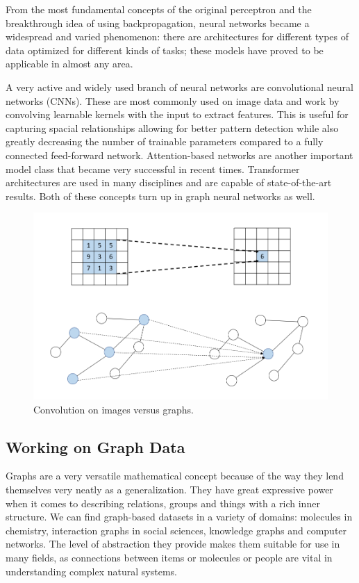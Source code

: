 	From the most fundamental concepts of the original perceptron and the breakthrough idea of using backpropagation, neural networks became a widespread and varied phenomenon: there are architectures for different types of data optimized for different kinds of tasks; these models have proved to be applicable in almost any area\cite{shrestha2019review}.
	
	A very active and widely used branch of neural networks are convolutional neural networks (CNNs)\cite{li2021survey}. These are most commonly used on image data and work by convolving learnable kernels with the input to extract features. This is useful for capturing spacial relationships allowing for better pattern detection while also greatly decreasing the number of trainable parameters compared to a fully connected feed-forward network. Attention-based networks\cite{vaswani2017attention} are another important model class that became very successful in recent times. Transformer architectures are used in many disciplines and are capable of state-of-the-art results. Both of these concepts turn up in graph neural networks as well.
	
	\begin{figure}[!h]
		\centering
		\includegraphics[width=\textwidth]{figures/convolution.png}
		\caption{Convolution on images versus graphs.}
	\end{figure}
	
	\subsection{Working on Graph Data}
	
	Graphs are a very versatile mathematical concept because of the way they lend themselves very neatly as a generalization. They have great expressive power when it comes to describing relations, groups and things with a rich inner structure. We can find graph-based datasets in a variety of domains: molecules in chemistry, interaction graphs in social sciences, knowledge graphs and computer networks\cite{gnn_review}. The level of abstraction they provide makes them suitable for use in many fields, as connections between items or molecules or people are vital in understanding complex natural systems.
	
